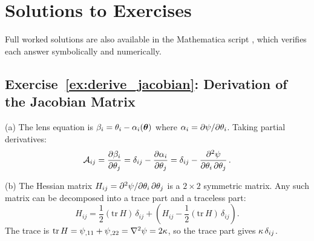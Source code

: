 
\section{Solutions to Exercises}
\label{sec:mag_solutions}

\noindent
Full worked solutions are also available in the Mathematica script
,
which verifies each answer symbolically and numerically.

\subsection*{Exercise~\ref{ex:derive_jacobian}: Derivation of the Jacobian Matrix}

(a) The lens equation is $\beta_i = \theta_i - \alpha_i(\boldsymbol{\theta})$
where $\alpha_i = \partial\psi/\partial\theta_i$.  Taking partial
derivatives:
\begin{equation*}
    \mathcal{A}_{ij} = \frac{\partial\beta_i}{\partial\theta_j}
    = \delta_{ij} - \frac{\partial\alpha_i}{\partial\theta_j}
    = \delta_{ij} - \frac{\partial^2\psi}{\partial\theta_i\,\partial\theta_j} \,.
\end{equation*}

(b) The Hessian matrix $H_{ij} = \partial^2\psi/\partial\theta_i\,\partial\theta_j$
is a $2 \times 2$ symmetric matrix.  Any such matrix can be decomposed
into a trace part and a traceless part:
\begin{equation*}
    H_{ij} = \frac{1}{2}(\mathrm{tr}\,H)\,\delta_{ij}
    + \left(H_{ij} - \frac{1}{2}(\mathrm{tr}\,H)\,\delta_{ij}\right) .
\end{equation*}
The trace is $\mathrm{tr}\,H = \psi_{,11} + \psi_{,22} = \nabla^2\psi = 2\kappa$,
so the trace part gives $\kappa\,\delta_{ij}$.

